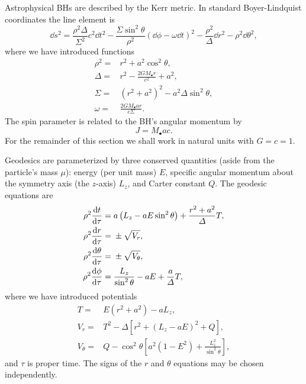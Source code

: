 Astrophysical BHs are described by the Kerr metric\cite{Kerr1963}. In standard Boyer-Lindquist coordinates the line element is\cite{Boyer1967, Hobson2006}
\begin{equation}
\dd s^2 = \frac{\rho^2 \Delta}{\Sigma^2}c^2\dd t^2 - \frac{\Sigma \sin^2 \theta}{\rho^2}\left(\dd \phi - \omega \dd t\right)^2 - \frac{\rho^2}{\Delta}\dd r^2 - \rho^2\dd \theta^2,
\end{equation}
where we have introduced functions
\begin{align}
\rho^2 = {} & r^2 + a^2\cos^2\theta,\\
\Delta = {} & r^2 - \frac{2GM_\bullet r}{c^2} + a^2,\\
\Sigma = {} & \left(r^2 +a^2\right)^2 - a^2\Delta\sin^2\theta,\\
\omega = {} & \frac{2GM_\bullet ar}{c\Sigma}.
\end{align}
The spin parameter is related to the BH's angular momentum by
\begin{equation}
J = M_\bullet ac.
\end{equation}
For the remainder of this section we shall work in natural units with $G = c = 1$.

Geodesics are parameterized by three conserved quantities (aside from the particle's mass $\mu$): energy (per unit mass) $E$, specific angular momentum about the symmetry axis (the $z$-axis) $L_z$, and Carter constant $Q$\cite{Carter1968, Chandrasekhar1998}. The geodesic equations are
\begin{align}
\rho^2 \frac{\mathrm{d} {t}}{\mathrm{d} {\tau}} = {} & a\left(L_z - aE\sin^2 \theta\right) + \frac{r^2 + a^2}{\Delta}T,\\
\rho^2 \frac{\mathrm{d} {r}}{\mathrm{d} {\tau}} = {} & \pm \sqrt{V_r},\\
\rho^2 \frac{\mathrm{d} {\theta}}{\mathrm{d} {\tau}} = {} & \pm \sqrt{V_\theta},\\
\rho^2 \frac{\mathrm{d} {\phi}}{\mathrm{d} {\tau}} = {} & \frac{L_z}{\sin^2 \theta} - aE + \frac{a}{\Delta}T,
\end{align}
where we have introduced potentials
\begin{align}
T = {} & E\left(r^2 +a^2\right) - aL_z,\\
V_r = {} & T^2 - \Delta\left[r^2 + \left(L_z -aE\right)^2 + Q\right],\\
V_\theta = {} & Q - \cos^2 \theta\left[a^2\left(1 - E^2\right) + \frac{L_z^2}{\sin^2\theta}\right],
\end{align}
and $\tau$ is proper time. The signs of the $r$ and $\theta$ equations may be chosen independently.

